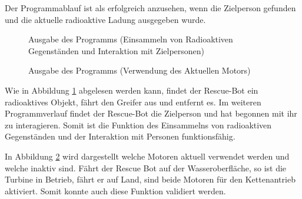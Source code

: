 Der Programmablauf ist als erfolgreich anzusehen, wenn die Zielperson gefunden und die aktuelle radioaktive Ladung ausgegeben wurde.

\begin{figure}[H]
  \caption{Ausgabe des Programms (Einsammeln von Radioaktiven Gegenständen und Interaktion mit Zielpersonen)}
  \label{output}
\end{figure}

\begin{figure}[H]
  \caption{Ausgabe des Programms (Verwendung des Aktuellen Motors)}
  \label{waterr}
\end{figure}

Wie in Abbildung \ref{output} abgelesen werden kann, findet der Rescue-Bot ein radioaktives Objekt, fährt den Greifer aus und entfernt es. Im weiteren Programmverlauf findet der Rescue-Bot die Zielperson und hat begonnen mit ihr zu interagieren. Somit ist die Funktion des Einsammelns von radioaktiven Gegenständen und der Interaktion mit Personen funktionsfähig.  

In Abbildung \ref{waterr} wird dargestellt welche Motoren aktuell verwendet werden und welche inaktiv sind. Fährt der Rescue Bot auf der Wasseroberfläche, so ist die Turbine in Betrieb, fährt er auf Land, sind beide Motoren für den Kettenantrieb aktiviert. Somit konnte auch diese Funktion validiert werden.


